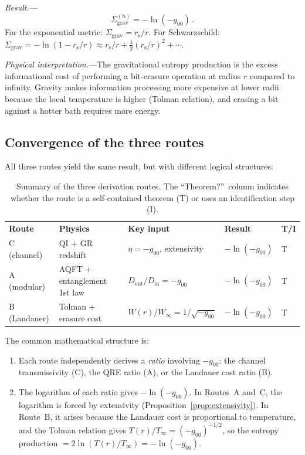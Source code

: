 \documentclass[aps,prd,preprint,superscriptaddress,longbibliography]{revtex4-2}
\newcommand{\rs}{r_{\mathrm{s}}}
\newcommand{\Sgrav}{\Sigma_{\mathrm{grav}}}
\begin{document}
\emph{Result.}---
\begin{equation}
  \boxed{\Sgrav^{(\mathrm{b})} = -\ln(-g_{00})\,.}
  \label{eq:route_b_result}
\end{equation}
For the exponential metric: $\Sgrav = \rs/r$.  For Schwarzschild:
$\Sgrav = -\ln(1-\rs/r) \approx \rs/r + \frac{1}{2}(\rs/r)^2 + \cdots$.

\emph{Physical interpretation.}---The gravitational entropy production
is the excess informational cost of performing a bit-erasure operation
at radius $r$ compared to infinity.  Gravity makes information
processing more expensive at lower radii because the local temperature
is higher (Tolman relation), and erasing a bit against a hotter bath
requires more energy.

\subsection{Convergence of the three routes}
\label{sec:convergence}

All three routes yield the same result, but with different logical
structures:

\begin{table}[h]
\caption{\label{tab:routes}Summary of the three derivation routes.
The ``Theorem?''\ column indicates whether the route is a
self-contained theorem (T) or uses an identification step (I).}
\begin{ruledtabular}
\begin{tabular}{lllll}
  \textbf{Route} & \textbf{Physics} & \textbf{Key input}
    & \textbf{Result} & \textbf{T/I} \\
  \colrule
  C (channel) & QI + GR redshift
    & $\eta = -g_{00}$, extensivity & $-\ln(-g_{00})$ & T \\
  A (modular) & AQFT + entanglement 1st law
    & $D_{\mathrm{out}}/D_{\mathrm{in}} = -g_{00}$ & $-\ln(-g_{00})$ & T \\
  B (Landauer) & Tolman + erasure cost
    & $W(r)/W_\infty = 1/\sqrt{-g_{00}}$ & $-\ln(-g_{00})$ & T \\
\end{tabular}
\end{ruledtabular}
\end{table}

The common mathematical structure is:
\begin{enumerate}
  \item Each route independently derives a \emph{ratio} involving
  $-g_{00}$: the channel transmissivity (C), the QRE ratio (A),
  or the Landauer cost ratio (B).
  \item The logarithm of each ratio gives $-\ln(-g_{00})$.  In
  Routes~A and~C, the logarithm is forced by extensivity
  (Proposition~\ref{prop:extensivity}).  In Route~B, it arises
  because the Landauer cost is proportional to temperature,
  and the Tolman relation gives $T(r)/T_\infty = (-g_{00})^{-1/2}$,
  so the entropy production $= 2\ln(T(r)/T_\infty) = -\ln(-g_{00})$.
\end{enumerate}
\end{document}
